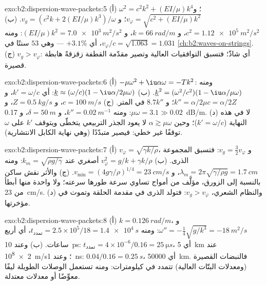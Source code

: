 \begin{solution}{exo:b2:dispersion-wave-packets:5}
(أ) $\omega^2 = c^2k^2 + (EI/\mu)k^4$؛ و $v_\varphi = \sqrt{c^2 + (EI/\mu)k^2}$؛ و $v_g = (c^2k +
2(EI/\mu)k^3)/\omega$. (ب) $c^2 = \qty{1.12e5}{m^2/s^2}$، و $k = \qty{66}{rad/m}$، و $(EI/\mu)k^2
= \qty{7.0e3}{m^2/s^2}$: ومنه $v_\varphi/c = \sqrt{1.063} = 1.031$، أي $+3.1\%$ --- وهي $53$ سنتًا في
\cref{ch:b2:waves-on-strings}. (ج) $v_g > v_\varphi$: أي شاذّ؛ فتسبق التوافقيات
العالية وتصير مقدّمة القطفة زقزقةً هابطة قصيرة.
\end{solution}

\begin{solution}{exo:b2:dispersion-wave-packets:6}
(أ) $-\mu\omega^2 + \iu\alpha\omega = -Tk^2$: ومنه $\underline k^2 = (\omega^2/c^2)(1 - \iu\alpha/\mu\omega)$.
(ب) $\underline k \approx (\omega/c)(1 - \iu\alpha/2\mu\omega)$: أي $k' = \omega/c$، و $k'' = \alpha/2\mu c =
\alpha/2Z$؛ و $8.7k''$  في المتر. (ج) $c = \qty{100}{m/s}$، و $Z = \qty{0.5}{kg/s}$، و $\mu\omega = 3.1 \gg
0.02$: ومنه $k'' = \qty{0.02}{m^{-1}}$، و $\delta = \qty{50}{m}$، و \qty{0.17}{dB/m}. (د) لا في هذه
النهاية ($k' = \omega/c$)؛ وحين $\alpha \gtrsim \mu\omega$ لا يعود الجذر التربيعي
يتخطّى ويتوقف $k'$ على $\omega$ توقفًا غير خطي: فيصير متبدّدًا (وهي
نهاية الكابل الانتشارية).
\end{solution}

\begin{solution}{exo:b2:dispersion-wave-packets:7}
(أ) $v_\varphi = \sqrt{\gamma k/\rho}$، و $v_g = \tfrac32v_\varphi$: فتسبق المجموعة
الذرى. (ب) $v_\varphi^2 = g/k + \gamma k/\rho$ أصغري عند $k_m = \sqrt{\rho g/\gamma}$:
ومنه $\lambda_m = 2\pi\sqrt{\gamma/\rho g} = \qty{1.7}{cm}$، و $v_{\min} = (4g\gamma/\rho)^{1/4} =
\qty{23}{cm/s}$. (ج) والأثر نقش ساكن بالنسبة إلى
الزورق، مؤلَّف من أمواج تساوي سرعة طورها سرعته؛ ولا واحدة منها
أبطأ من \qty{23}{cm/s}. (د) والنظام الشعري، $v_g > v_\varphi$: فتولد الذرى
في مقدمة الحلقة وتموت في مؤخرتها.
\end{solution}

\begin{solution}{exo:b2:dispersion-wave-packets:8}
(أ) $k = \qty{0.126}{rad/m}$، و $\omega'' = -\tfrac14\sqrt{g/k^3} = \qty{-18}{m^2/s}$: ومنه $t_{\text{تمدد}}
= 2.5 \times 10^5/18 = \qty{1.4e4}{s}$، أي أربع ساعات. (ب) وعند \qty{10}{ps}: $t_{\text{تمدد}} =
4 \times 10^{-6}/0.16 = \qty{25}{\micro s}$، أي \qty{5}{km} عند \qty{2e8}{m/s}؛ وعند \qty{1}{ns}: $0.04/0.16 =
\qty{0.25}{s}$، أي \qty{50000}{km}. فالنبضات القصيرة (ومعدلات البتّات العالية) تتمدد في
كيلومترات: ومنه تستعمل الوصلات الطويلة ليفًا معوِّضًا أو معدلات معتدلة.
\end{solution}

